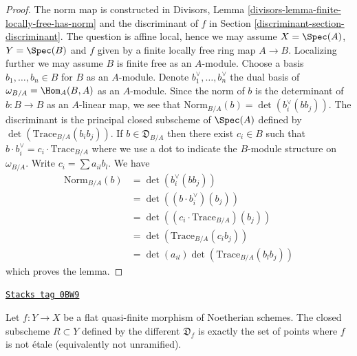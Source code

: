 \begin{proof}
The norm map is constructed in
Divisors, Lemma \ref{divisors-lemma-finite-locally-free-has-norm}
and the discriminant of $f$ in Section \ref{discriminant-section-discriminant}.
The question is affine local, hence we may assume $X = \Spec(A)$,
$Y = \Spec(B)$ and $f$ given by a finite locally free ring map $A \to B$.
Localizing further we may assume $B$ is finite free as an $A$-module.
Choose a basis $b_1, \ldots, b_n \in B$ for $B$ as an $A$-module.
Denote $b_1^\vee, \ldots, b_n^\vee$ the dual basis of
$\omega_{B/A} = \Hom_A(B, A)$ as an $A$-module.
Since the norm of $b$ is the determinant of $b : B \to B$ as an
$A$-linear map, we see that
$\text{Norm}_{B/A}(b) = \det(b_i^\vee(bb_j))$.
The discriminant is the principal closed subscheme of $\Spec(A)$
defined by $\det(\text{Trace}_{B/A}(b_ib_j))$.
If $b \in \mathfrak{D}_{B/A}$ then
there exist $c_i \in B$ such that
$b \cdot b_i^\vee = c_i \cdot \text{Trace}_{B/A}$ where
we use a dot to indicate the $B$-module structure on $\omega_{B/A}$.
Write $c_i = \sum a_{il} b_l$.
We have
\begin{align*}
\text{Norm}_{B/A}(b)
& =
\det(b_i^\vee(bb_j)) \\
& =
\det( (b \cdot b_i^\vee)(b_j)) \\
& =
\det((c_i \cdot \text{Trace}_{B/A})(b_j)) \\
& =
\det(\text{Trace}_{B/A}(c_ib_j)) \\
& =
\det(a_{il}) \det(\text{Trace}_{B/A}(b_l b_j))
\end{align*}
which proves the lemma.
\end{proof}

\begin{lemma}
\label{discriminant-lemma-different-ramification}
\href{https://stacks.math.columbia.edu/tag/0BW9}{\texttt{Stacks tag 0BW9}}

Let $f : Y \to X$ be a flat quasi-finite morphism of Noetherian schemes.
The closed subscheme $R \subset Y$ defined by the different $\mathfrak{D}_f$
is exactly the set of points where $f$ is not \'etale
(equivalently not unramified).
\end{lemma}

